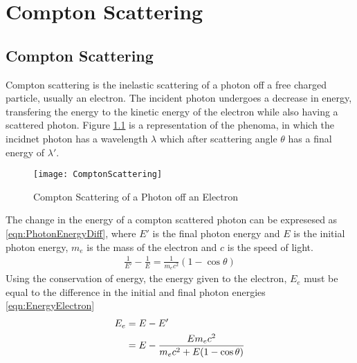 \chapter{Compton Scattering}
\label{ch:ComptonScattering}

\section{Compton Scattering}
Compton scattering is the inelastic scattering of a photon off a free charged particle, usually an electron.
The incident photon undergoes a decrease in energy, transfering the energy to the kinetic energy of the electron while also having a scattered photon.
Figure \ref{fig:ComptonScattering} is a representation of the phenoma, in which the incidnet photon has a wavelength $\lambda$ which after scattering angle $\theta$ has a final energy of $\lambda'$.
\begin{figure}
  \centering
  \texttt{[image: ComptonScattering]}
  \caption{Compton Scattering of a Photon off an Electron}
  \label{fig:ComptonScattering}
\end{figure}
The change in the energy of a compton scattered photon can be expresesed as \eqref{eqn:PhotonEnergyDiff}, where $E'$ is the final photon energy and $E$ is the initial photon energy, $m_e$ is the mass of the electron and $c$ is the speed of light.
\begin{align}
  \label{eqn:FinalPhotonEnergy}
  \frac{1}{E'} -\frac{1}{E} = \frac{1}{m_e c^2}\left(1-\cos\theta\right) 
\end{align}
Using the conservation of energy, the energy given to the electron, $E_e$ must be equal to the difference in the initial and final photon energies \eqref{eqn:EnergyElectron}
\begin{align}
  \label{eqn:EnergyElectron}
  E_e &= E - E' \\ \notag
   &= E - \frac{E m_e c^2}{m_e c^2 + E (1-\cos\theta)}
\end{align}

